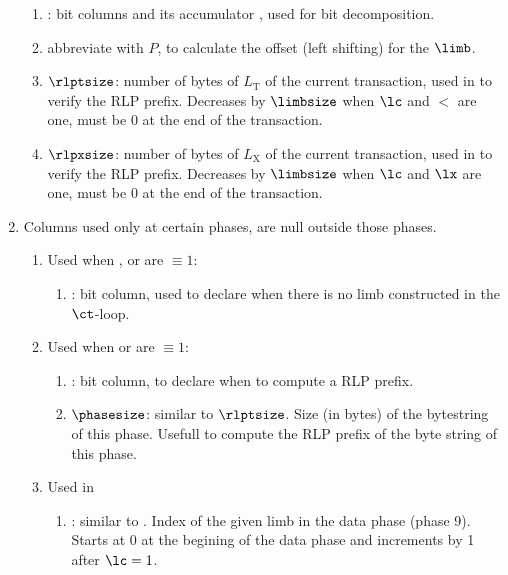 \begin{enumerate}
\begin{enumerate}
            \item \genBit{}:
                bit columns and its accumulator \genBitAcc{}, used for bit decomposition.
            \item \Power{} abbreviate with $P$, to calculate the offset (left shifting) for the $\limb$.
            \item $\rlptsize$:
                number of bytes of $L_{\mathrm{T}}$ of the current transaction, used in \phaseRlpPrefix{} to verify the RLP prefix. Decreases by $\limbsize$ when $\lc$ and $\lt$ are one, must be 0 at the end of the transaction.
            \item $\rlpxsize$:
                number of bytes of $L_{\mathrm{X}}$ of the current transaction, used in \phaseRlpPrefix{} to verify the RLP prefix. Decreases by $\limbsize$ when $\lc$ and $\lx$ are one, must be 0 at the end of the transaction.
        \end{enumerate}
    \item Columns used only at certain phases, are null outside those phases.
        \begin{enumerate}
            \item Used when \phaseRlpPrefix{}, \phaseData{} or \phaseBeta{} are $\equiv 1$:
                \begin{enumerate}
                    \item \ispadding:
                        bit column, used to declare when there is no limb constructed in the $\ct$-loop.
                \end{enumerate}
            \item Used when \phaseData{} or \phaseAccessList{} are $\equiv 1$:
                \begin{enumerate}
                    \item \isPrefix:
                        bit column, to declare when to compute a RLP prefix.
                    \item $\phasesize$:
                        similar to $\rlptsize$. Size (in bytes) of the bytestring of this phase. Usefull to compute the RLP prefix of the byte string of this phase.
                \end{enumerate}
            \item Used in \phaseData{}
                \begin{enumerate}
                    \item \indexData{}:
                        similar to \index. Index of the given limb in the data phase (phase 9). Starts at 0 at the begining of the data phase and increments by 1 after $\lc = 1$.

\end{enumerate}
\end{enumerate}
\end{enumerate}
